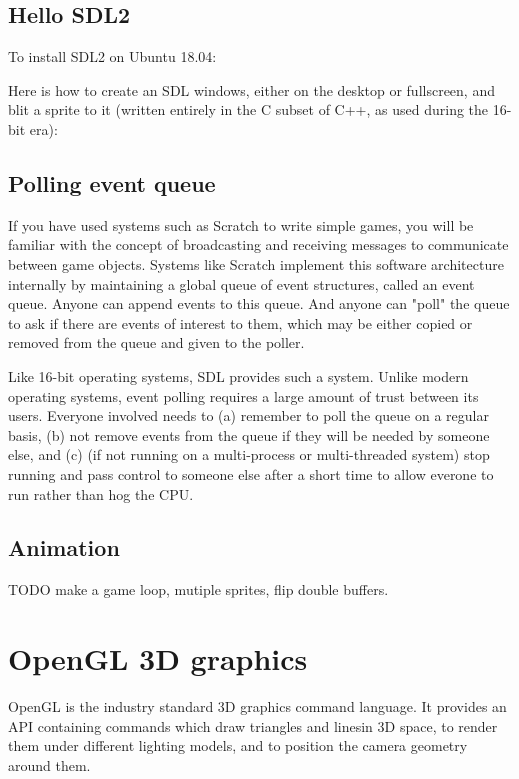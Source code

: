 \documentclass[oneside,english]{scrbook}
\begin{document}
\section{Hello SDL2}

To install SDL2 on Ubuntu 18.04:


Here is how to create an SDL windows, either on the desktop or fullscreen, and blit a sprite to it (written entirely in the C subset of C++, as used during the 16-bit era):



\section{Polling event queue}
If you have used systems such as Scratch to write simple games, you will be familiar with the concept of broadcasting and receiving messages to communicate between game objects.   Systems like Scratch implement this software architecture internally by maintaining a global queue of event structures, called an event queue.  Anyone can append events to this queue.  And anyone can "poll" the queue to ask if there are events of interest to them, which may be either copied or removed from the queue and given to the poller.  

Like 16-bit operating systems, SDL provides such a system. Unlike modern operating systems, event polling requires a large amount of trust between its users. Everyone involved needs to (a) remember to poll the queue on a regular basis, (b) not remove events from the queue if they will be needed by someone else, and (c) (if not running on a multi-process or multi-threaded system) stop running and pass control to someone else after a short time to allow everone to run rather than hog the CPU.

\section{Animation}
TODO make a game loop, mutiple sprites, flip double buffers.






\chapter{OpenGL 3D graphics}

OpenGL is the industry standard 3D graphics command language.  It provides an API containing commands which draw triangles and linesin 3D space, to render them under different lighting models, and to position the camera geometry around them.
\end{document}
